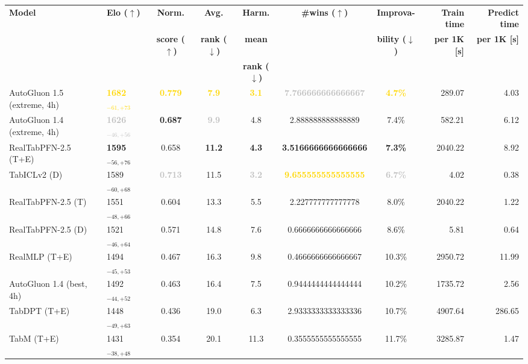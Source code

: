 \begin{tabular}{llcccccrr}
\toprule
\textbf{Model} & \textbf{Elo ($\uparrow$)} & \textbf{Norm.} & \textbf{Avg.} & \textbf{Harm.} & \textbf{\#wins ($\uparrow$)} & \textbf{Improva-} & \textbf{Train time} & \textbf{Predict time} \\
 &  & \textbf{score ($\uparrow$)} & \textbf{rank ($\downarrow$)} & \textbf{mean} &  & \textbf{bility ($\downarrow$)} & \textbf{per 1K [s]} & \textbf{per 1K [s]} \\
 &  &  &  & \textbf{rank ($\downarrow$)} &  &  &  &  \\
\midrule
AutoGluon 1.5 (extreme, 4h) & \textcolor{gold}{\textbf{1682${}_{-61,+73}$}} & \textcolor{gold}{\textbf{0.779}} & \textcolor{gold}{\textbf{7.9}} & \textcolor{gold}{\textbf{3.1}} & \textcolor{silver}{\textbf{7.766666666666667}} & \textcolor{gold}{\textbf{4.7\%}} & 289.07 & 4.03 \\
AutoGluon 1.4 (extreme, 4h) & \textcolor{silver}{\textbf{1626${}_{-46,+56}$}} & \textcolor{bronze}{\textbf{0.687}} & \textcolor{silver}{\textbf{9.9}} & 4.8 & 2.888888888888889 & 7.4\% & 582.21 & 6.12 \\
RealTabPFN-2.5 (T+E) & \textcolor{bronze}{\textbf{1595${}_{-56,+76}$}} & 0.658 & \textcolor{bronze}{\textbf{11.2}} & \textcolor{bronze}{\textbf{4.3}} & \textcolor{bronze}{\textbf{3.5166666666666666}} & \textcolor{bronze}{\textbf{7.3\%}} & 2040.22 & 8.92 \\
TabICLv2 (D) & 1589${}_{-60,+68}$ & \textcolor{silver}{\textbf{0.713}} & 11.5 & \textcolor{silver}{\textbf{3.2}} & \textcolor{gold}{\textbf{9.655555555555555}} & \textcolor{silver}{\textbf{6.7\%}} & 4.02 & 0.38 \\
RealTabPFN-2.5 (T) & 1551${}_{-48,+66}$ & 0.604 & 13.3 & 5.5 & 2.227777777777778 & 8.0\% & 2040.22 & 1.22 \\
RealTabPFN-2.5 (D) & 1521${}_{-46,+64}$ & 0.571 & 14.8 & 7.6 & 0.6666666666666666 & 8.6\% & 5.81 & 0.64 \\
RealMLP (T+E) & 1494${}_{-45,+53}$ & 0.467 & 16.3 & 9.8 & 0.4666666666666667 & 10.3\% & 2950.72 & 11.99 \\
AutoGluon 1.4 (best, 4h) & 1492${}_{-44,+52}$ & 0.463 & 16.4 & 7.5 & 0.9444444444444444 & 10.2\% & 1735.72 & 2.56 \\
TabDPT (T+E) & 1448${}_{-49,+63}$ & 0.436 & 19.0 & 6.3 & 2.9333333333333336 & 10.7\% & 4907.64 & 286.65 \\
TabM (T+E) & 1431${}_{-38,+48}$ & 0.354 & 20.1 & 11.3 & 0.3555555555555555 & 11.7\% & 3285.87 & 1.47 \\

\end{tabular}
